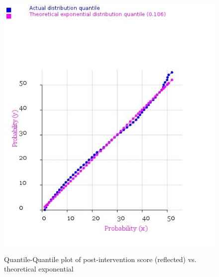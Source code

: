 \documentclass[10pt]{article}
\begin{document}
\begin{figure}
\caption{Quantile-Quantile plot of post-intervention score (reflected) vs. theoretical exponential}
\label{QQPlotPostVsExponential}
\begin{center}
\includegraphics[width=120mm]{ReportMedia/QQPlotPostVsExponential.jpg}\\
\end{center}
\end{figure}
\newpage
\end{document}
